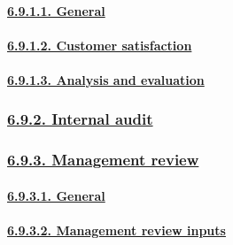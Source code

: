 \documentclass[
]{article}
\begin{document}
\hypertarget{general-6}{%
\paragraph{\texorpdfstring{\protect\hyperlink{general-15}{6.9.1.1.
General}}{6.9.1.1. General}}\label{general-6}}

\hypertarget{customer-satisfaction}{%
\paragraph{\texorpdfstring{\protect\hyperlink{customer-satisfaction-1}{6.9.1.2.
Customer
satisfaction}}{6.9.1.2. Customer satisfaction}}\label{customer-satisfaction}}

\hypertarget{analysis-and-evaluation}{%
\paragraph{\texorpdfstring{\protect\hyperlink{analysis-and-evaluation-1}{6.9.1.3.
Analysis and
evaluation}}{6.9.1.3. Analysis and evaluation}}\label{analysis-and-evaluation}}

\hypertarget{internal-audit}{%
\subsubsection{\texorpdfstring{\protect\hyperlink{internal-audit-1}{6.9.2.
Internal audit}}{6.9.2. Internal audit}}\label{internal-audit}}

\hypertarget{management-review}{%
\subsubsection{\texorpdfstring{\protect\hyperlink{management-review-1}{6.9.3.
Management review}}{6.9.3. Management review}}\label{management-review}}

\hypertarget{general-7}{%
\paragraph{\texorpdfstring{\protect\hyperlink{general-16}{6.9.3.1.
General}}{6.9.3.1. General}}\label{general-7}}

\hypertarget{management-review-inputs}{%
\paragraph{\texorpdfstring{\protect\hyperlink{management-review-inputs-1}{6.9.3.2.
Management review
inputs}}{6.9.3.2. Management review inputs}}\label{management-review-inputs}}
\end{document}
